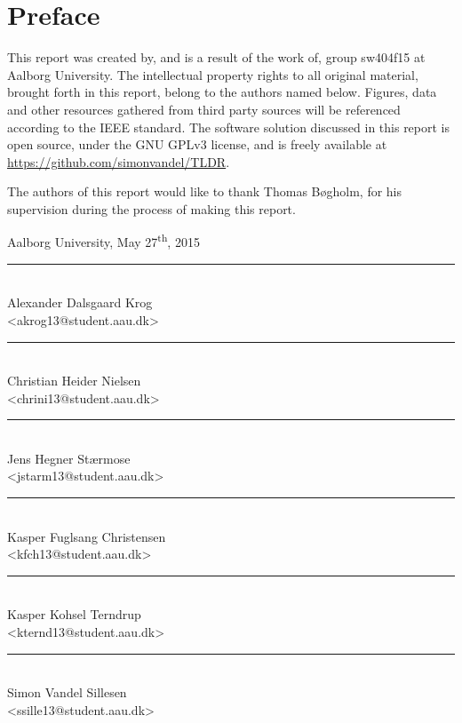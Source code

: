\chapter{Preface}\label{ch:preface}
This report was created by, and is a result of the work of, group sw404f15 at Aalborg University. 
The intellectual property rights to all original material, brought forth in this report, belong to the authors named below. 
Figures, data and other resources gathered from third party sources will be referenced according to the IEEE standard. 
The software solution discussed in this report is open source, under the GNU GPLv3 license, and is freely available at \url{https://github.com/simonvandel/TLDR}.

The authors of this report would like to thank Thomas Bøgholm, for his supervision during the process of making this report.

\vspace{\baselineskip}\hfill Aalborg University, May 27\textsuperscript{th}, 2015
\vfill

\noindent
\begin{minipage}[b]{0.45\textwidth}
 \centering
 \rule{\textwidth}{0.5pt}\\
  Alexander Dalsgaard Krog\\
 {\footnotesize <akrog13@student.aau.dk>}
\end{minipage}
%
\hfill
%
\begin{minipage}[b]{0.45\textwidth}
 \centering
 \rule{\textwidth}{0.5pt}\\
  Christian Heider Nielsen\\
 {\footnotesize <chrini13@student.aau.dk>}
\end{minipage}
%
\vspace{3\baselineskip}

\noindent
\begin{minipage}[b]{0.45\textwidth}
 \centering
 \rule{\textwidth}{0.5pt}\\
 Jens Hegner Stærmose\\
 {\footnotesize <jstarm13@student.aau.dk>}
\end{minipage}
%
\hfill
%
\begin{minipage}[b]{0.45\textwidth}
 \centering
 \rule{\textwidth}{0.5pt}\\
  Kasper Fuglsang Christensen\\
 {\footnotesize <kfch13@student.aau.dk>}
\end{minipage}
\vspace{3\baselineskip}

\noindent
\begin{minipage}[b]{0.45\textwidth}
 \centering
 \rule{\textwidth}{0.5pt}\\
 Kasper Kohsel Terndrup\\
 {\footnotesize <kternd13@student.aau.dk>}
\end{minipage}
\hfill
\begin{minipage}[b]{0.45\textwidth}
 \centering
 \rule{\textwidth}{0.5pt}\\
  Simon Vandel Sillesen\\
 {\footnotesize <ssille13@student.aau.dk>}
\end{minipage}
\vspace{3\baselineskip}

